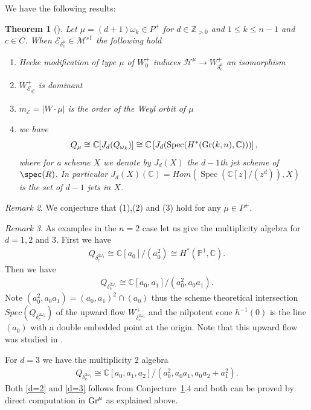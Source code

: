 \documentclass[12pt]{article}
\numberwithin{equation}{section}
\newtheorem{theorem}{Theorem}
\theoremstyle{remark}
\newtheorem{remark}[theorem]{Remark}
\numberwithin{theorem}{section}
\def\beq{\begin{eqnarray}}
\def\eeq{\end{eqnarray}}
\def\calE{{\mathcal E}}
\DeclareMathOperator{\Spec}{Spec}
\def\C{\mathbb{C}}
\def\M{{\mathcal{M}}}
\def\calH{\mathcal{H}}
\def\P{\mathbb{P}}
\newcommand{\T}{{\mathbb{T}}}
\def\Z{\mathbb{Z}}
\newcommand{\Gr}{\textnormal{Gr}}
\numberwithin{equation}{section}
\begin{document}
We have the following results:

\begin{theorem}[\cite{hausel-hitchin1}] \label{conjecturewobbly} Let $\mu=(d+1)\omega_k\in P^+$  for $d\in \Z_{>0}$ and $1\leq k\leq n-1$ and $c\in C$.  When  $\calE_{\delta^\mu_c}\in \M^{s\T}$ the following hold
	\begin{enumerate}
		\item  Hecke modification of type $\mu$ of $W^+_0$  induces $\calH^\mu \to W^+_{\delta^\mu_c}$  an isomorphism
		\item $W^+_{\calE_{\delta^\mu_c}}$ is dominant
		\item $m_\calE=|W\cdot \mu|$ is the order of the Weyl orbit of $\mu$
		\item  we have
		$$Q_{\mu}\cong \C[J_d(Q_{\omega_k})]\cong \C\left[J_d(\Spec(H^*(\Gr(k,n),\C)))\right],$$ where for a scheme $X$ we denote by $J_d(X)$ the  $d-1$th jet scheme of $\spec(R)$.	In particular $J_d(X)(\C)=Hom(\Spec(\C[z]/(z^d)),X)$ is the set of $d-1$ jets in $X$. \end{enumerate}
\end{theorem}

\begin{remark} We conjecture that (1),(2) and (3) hold for any $\mu \in P^+$. 
\end{remark}

\begin{remark}
	
	As examples in the $n=2$ case let us give the multiplicity algebra for $d=1,2$ and $3$.
	First we have \beq \label{d=1} Q_{\delta_c^{2\omega_1}}\cong\C[a_0]/(a_0^2)\cong H^*(\P^1,\C).\eeq Then we have \beq \label{d=2} Q_{\delta_c^{2\omega_1}}\cong \C[a_0,a_1]/(a_0^2,a_0a_1).\eeq Note $(a_0^2,a_0a_1)=(a_0,a_1)^2\cap (a_0)$ thus the scheme theoretical intersection $Spec(Q_{\delta_c^{2\omega_1}})$ of the upward flow $W^+_{\delta_c^{2\omega_1}}$ and the nilpotent cone $h^{-1}(0)$ is the line $(a_0)$ with a double embedded point at the origin. Note that this upward flow was studied in \cite[\S 8.2]{hausel-hitchin}.  
	
	For $d=3$ we have the multiplicity $2$ algebra \beq \label{d=3} Q_{\delta_c^{3\omega_1}}\cong \C[a_0,a_1,a_2]/(a_0^2,a_0a_1,a_0a_2+a_1^2).\eeq Both \eqref{d=2} and \eqref{d=3} follows from Conjecture~\ref{conjecturewobbly}.4 and both can be proved by direct computation in $\Gr^\mu$ as explained above. 
\end{remark}
\end{document}

